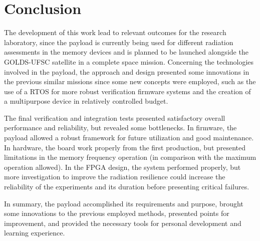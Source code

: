 %
%
%
%
%

%
%
%
%
%

\newpage

\section{Conclusion} \label{sec:conclusion}

The development of this work lead to relevant outcomes for the research laboratory, since the payload is currently being used for different radiation assessments in the memory devices and is planned to be launched alongside the GOLDS-UFSC satellite in a complete space mission. Concerning the technologies involved in the payload, the approach and design presented some innovations in the previous similar missions since some new concepts were employed, such as the use of a RTOS for more robust verification firmware systems and the creation of a multipurpose device in relatively controlled budget.

The final verification and integration tests presented satisfactory overall performance and reliability, but revealed some bottlenecks. In firmware, the payload allowed a robust framework for future utilization and good maintenance. In hardware, the board work properly from the first production, but presented limitations in the memory frequency operation (in comparison with the maximum operation allowed). In the FPGA design, the system performed properly, but more investigation to improve the radiation resilience could increase the reliability of the experiments and its duration before presenting critical failures.

In summary, the payload accomplished its requirements and purpose, brought some innovations to the previous employed methods, presented points for improvement, and provided the necessary tools for personal development and learning experience.



\clearpage